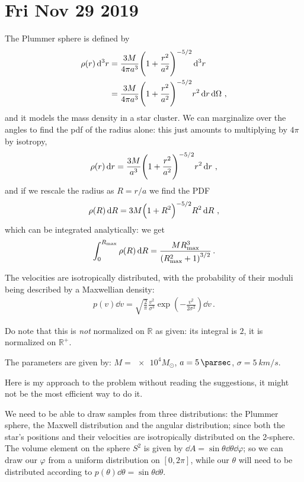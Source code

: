 \documentclass[main.tex]{subfiles}
\begin{document}
\section*{Fri Nov 29 2019}

The Plummer sphere is defined by 
%
\begin{align}
  \rho (r) \dd[3]{r} &= \frac{3M}{4 \pi a^3} \qty(1 + \frac{r^2}{a^2})^{-5/2} \dd[3]{r}  \\
  &= \frac{3M}{4 \pi a^3} \qty(1 + \frac{r^2}{a^2})^{-5/2} r^2 \dd{r} \dd{\Omega }
\,,
\end{align}
%
and it models the mass density in a star cluster.
We can marginalize over the angles to find the pdf of the radius alone: this just amounts to multiplying by \(4 \pi \) by isotropy,
%
\begin{align}
  \rho (r) \dd{r} = \frac{3M}{a^3} \qty(1 + \frac{r^2}{a^2})^{-5/2} r^2 \dd{r}
\,,
\end{align}
%
and if we rescale the radius as \(R = r/a\) we find the PDF 
%
\begin{align}
  \rho (R) \dd{R} = 3M \qty(1 + R^2)^{-5/2} R^2 \dd{R}
\,,
\end{align}
%
which can be integrated analytically: we get 
%
\begin{align}
  \int_{0}^{R_{\text{max}}} \rho(R) \dd{R} = \frac{ M R^3 _{\text{max}}}{\qty(R^2 _{\text{max}} + 1)^{3/2}}
\,.
\end{align}
%

The velocities are isotropically distributed, with the probability of their moduli being described by a Maxwellian density: 
%
\begin{align}
  p(v) \dd{v} = \sqrt{\frac{2}{\pi }} \frac{v^2}{\sigma^3}
  \exp( -\frac{v^2}{2 \sigma^2}) \dd{v}
\,.
\end{align}

Do note that this is \emph{not} normalized on \(\mathbb{R}\) as given: its integral is \(2\), it is normalized on \(\mathbb{R}^{+}\).

The parameters are given by: \(M = \num{e4} M_{\odot}\), \(a = \SI{5}{\parsec}\), \(\sigma = \SI{5}{km/s}\).

Here is my approach to the problem without reading the suggestions, it might not be the most efficient way to do it. 

We need to be able to draw samples from three distributions: the Plummer sphere, the Maxwell distribution and the angular distribution; since both the star's positions and their velocities are isotropically distributed on the 2-sphere. 
The volume element on the sphere \(S^{2}\) is given by \(\dd{A} = \sin \theta \dd{\theta } \dd{\varphi }\); so we can draw our \(\varphi \) from a uniform distribution on \([0, 2 \pi ]\), while our \(\theta \) will need to be distributed according to \(p(\theta ) \dd{\theta }= \sin \theta \dd{\theta }  \). 
\end{document}
